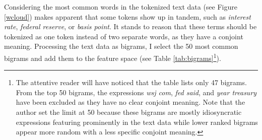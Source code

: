 \documentclass[11pt,a4paper,english,oneside]{book}
\numberwithin{equation}{chapter}
\begin{document}
Considering the most common words in the tokenized text data (see Figure \ref{wcloud}) makes apparent that some tokens show up in tandem, such as \textit{interest rate}, \textit{federal reserve}, or \textit{basis point}. It stands to reason that these terms should be tokenized as one token instead of two separate words, as they have a conjoint meaning. Processing the text data as bigrams, I select the 50 most common bigrams and add them to the feature space (see Table \ref{tab:bigrams}\footnote{The attentive reader will have noticed that the table lists only 47 bigrams. From the top 50 bigrams, the expressions \textit{wsj com}, \textit{fed said}, and \textit{year treasury} have been excluded as they have no clear conjoint meaning. Note that the author set the limit at 50 because these bigrams are mostly idiosyncratic expressions featuring prominently in the text data while lower ranked bigrams appear more random with a less specific conjoint meaning.}).
\end{document}
